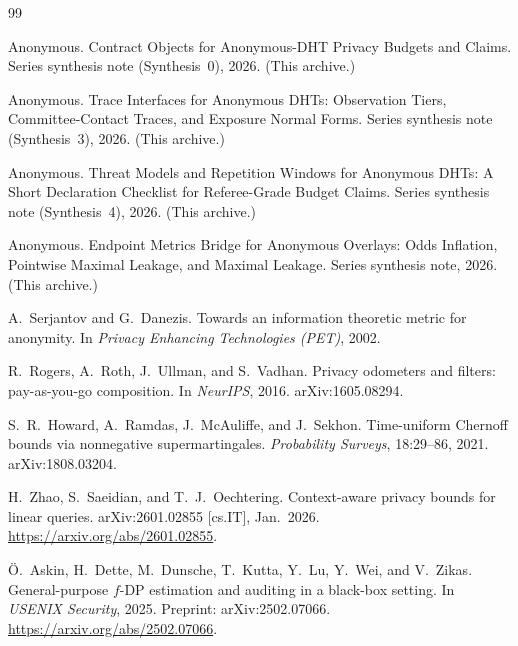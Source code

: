 \documentclass[11pt]{article}
\theoremstyle{definition}
\theoremstyle{remark}
\begin{document}
\begin{thebibliography}{99}\small

Anonymous.
\newblock Contract Objects for Anonymous-DHT Privacy Budgets and Claims.
\newblock Series synthesis note (Synthesis~0), 2026. (This archive.)


Anonymous.
\newblock Trace Interfaces for Anonymous DHTs: Observation Tiers, Committee-Contact Traces, and Exposure Normal Forms.
\newblock Series synthesis note (Synthesis~3), 2026. (This archive.)

Anonymous.
\newblock Threat Models and Repetition Windows for Anonymous DHTs: A Short Declaration Checklist for Referee-Grade Budget Claims.
\newblock Series synthesis note (Synthesis~4), 2026. (This archive.)

Anonymous.
\newblock Endpoint Metrics Bridge for Anonymous Overlays: Odds Inflation, Pointwise Maximal Leakage, and Maximal Leakage.
\newblock Series synthesis note, 2026. (This archive.)

A.~Serjantov and G.~Danezis.
\newblock Towards an information theoretic metric for anonymity.
\newblock In \emph{Privacy Enhancing Technologies (PET)}, 2002.

R.~Rogers, A.~Roth, J.~Ullman, and S.~Vadhan.
\newblock Privacy odometers and filters: pay-as-you-go composition.
\newblock In \emph{NeurIPS}, 2016. arXiv:1605.08294.

S.~R.~Howard, A.~Ramdas, J.~McAuliffe, and J.~Sekhon.
\newblock Time-uniform Chernoff bounds via nonnegative supermartingales.
\newblock \emph{Probability Surveys}, 18:29--86, 2021. arXiv:1808.03204.

H.~Zhao, S.~Saeidian, and T.~J.~Oechtering.
\newblock Context-aware privacy bounds for linear queries.
\newblock arXiv:2601.02855 [cs.IT], Jan.\ 2026. \url{https://arxiv.org/abs/2601.02855}.

\"{O}.~Askin, H.~Dette, M.~Dunsche, T.~Kutta, Y.~Lu, Y.~Wei, and V.~Zikas.
\newblock General-purpose $f$-DP estimation and auditing in a black-box setting.
\newblock In \emph{USENIX Security}, 2025. Preprint: arXiv:2502.07066. \url{https://arxiv.org/abs/2502.07066}.



\end{thebibliography}
\end{document}
